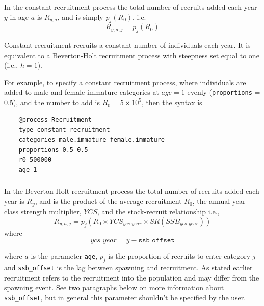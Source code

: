 \subsubsection*{}

In the constant recruitment process the total number of recruits added each year $y$ in age $a$ is $R_{y,a}$, and is simply $p_j(R_0)$, i.e.
\begin{equation}
  R_{y,a,j} = p_j(R_0)
\end{equation}

Constant recruitment recruits a constant number of individuals each year. It is equivalent to a Beverton-Holt recruitment process with steepness set equal to one (i.e., $h=1$).

For example, to specify a constant recruitment process, where individuals are added to male and female immature categories at $age=1$ evenly (\texttt{proportions} = 0.5), and the number to add is $R_0=5 \times 10^5$, then the syntax is

{\small{\begin{verbatim}
	@process Recruitment
	type constant_recruitment
	categories male.immature female.immature
	proportions 0.5 0.5
	r0 500000
	age 1
\end{verbatim}}}

\subsubsection*{}\label{subsubsec:BH-recruitment}

In the Beverton-Holt recruitment process the total number of recruits added each year is $R_y$, and is the product of the average recruitment $R_0$, the annual year class strength multiplier, $YCS$, and the stock-recruit relationship i.e.,
\begin{equation}\label{eq:BH}
  R_{y,a,j} = p_j(R_0 \times YCS_{ycs\_year} \times SR(SSB_{ycs\_year}))
\end{equation}
where
\begin{equation}\label{eq:year_class}
ycs\_year = y - \texttt{ssb\_offset}
\end{equation}

where $a$ is the parameter \texttt{age}, $p_j$ is the proportion of recruits to enter category $j$ and \texttt{ssb\_offset} is the lag between spawning and recruitment. As stated earlier recruitment refers to the recruitment into the population and may differ from the spawning event. See two paragraphs below on more information about \texttt{ssb\_offset}, but in general this parameter shouldn't be specified by the user.

